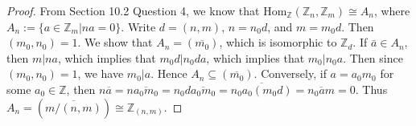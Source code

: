 \documentclass{article}
\begin{document}
  \begin{proof}
    From Section 10.2 Question 4, we know that
    $\text{Hom}_{\mathbb{Z}}(\mathbb{Z}_n,\mathbb{Z}_m) \cong A_n$, where
    $A_n:=\{a\in\mathbb{Z}_{m}|na=0\}$. 
    Write $d=(n,m)$, $n=n_0d$, and $m=m_0d$. Then $(m_0,n_0)=1$. We show
    that $A_n=(\overline{m_0})$, which is isomorphic to $\mathbb{Z}_{d}$.
    If $\bar{a}\in A_n$, then $m|na$, which implies that $m_0d|n_0da$,
    which implies that $m_0|n_0a$. Then since $(m_0,n_0)=1$, we have
    $m_0|a$. Hence $A_n\subseteq(\overline{m_0})$. Conversely, if $a=a_0m_0$
    for some $a_0\in\mathbb{Z}$, then $n\overline{a} =n\overline{a_0m_0}
    =n_0d\overline{a_0m_0} =\overline{n_0a_0(m_0d)} =\overline{n_0am} =0$.
    Thus $A_n=(\overline{m/(n,m)}) \cong\mathbb{Z}_{(n,m)}$.
  \end{proof}
\end{document}
